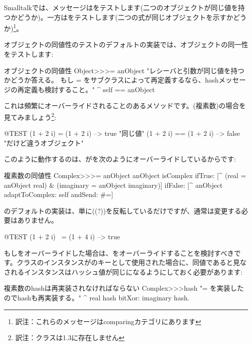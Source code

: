 \documentclass[a4paper,10pt,twoside]{book}
\begin{document}
Smalltalkでは、\ct{=}メッセージはをテストします(\ie 二つのオブジェクトが同じ値を持つかどうか)。一方\ct{==}はをテストします(\ie 二つの式が同じオブジェクトを示すかどうか)\footnote{訳注：これらのメッセージはcomparingカテゴリにあります}。

オブジェクトの同値性のテストのデフォルトの実装では、オブジェクトの同一性をテストします:
\begin{method}{オブジェクトの同値性}
Object>>>= anObject
    "レシーバと引数が同じ値を持つかどうか答える。
    もし = をサブクラスによって再定義するなら、hashメッセージの再定義も検討すること。"
    ^ self == anObject
\end{method}

これは頻繁にオーバーライドされることのあるメソッドです。(複素数)の場合を見てみましょう\footnote{訳注：クラスは\pharo 1.3に存在しません}:

\begin{code}{@TEST}
(1 + 2 i) = (1 + 2 i)   --> true     "同じ値"
(1 + 2 i) == (1 + 2 i) --> false    "だけど違うオブジェクト"
\end{code}

このように動作するのは、が\ct{=}を次のようにオーバーライドしているからです:
\begin{method}{複素数の同値性}
Complex>>>= anObject
    anObject isComplex
        ifTrue: [^ (real = anObject real) & (imaginary = anObject imaginary)]
        ifFalse: [^ anObject adaptToComplex: self andSend: #=]
\end{method}

のデフォルトの実装は、単に((?\ct{=}))を反転しているだけですが、通常は変更する必要はありません。

\begin{code}{@TEST}
(1 + 2 i) ~= (1 + 4 i) --> true
\end{code}

もし\ct{=}をオーバーライドした場合は、をオーバーライドすることを検討すべきです。クラスのインスタンスがのキーとして使用された場合に、同値であると見なされるインスタンスはハッシュ値が同じになるようにしておく必要があります:
\begin{method}{複素数のhashは再実装されなければならない}
Complex>>>hash
    "= を実装したのでhashも再実装する。"
    ^ real hash bitXor: imaginary hash.
\end{method}
\end{document}
